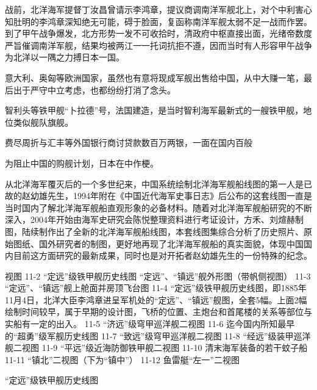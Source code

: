 \documentclass[12pt,UTF8]{ctexbook}
\begin{document}
战前，北洋海军提督丁汝昌曾请示李鸿章，提议商调南洋军舰北上，对个中利害心知肚明的李鸿章深知绝无可能，碍于脸面，复函称南洋军舰太弱不足一战而作罢。到了甲午战争爆发，北方形势一发不可收拾时，清政府中枢直接出面，光绪帝数度严旨催调南洋军舰，结果均被两江一一托词抗拒不遵，因而当时有人形容甲午战争为北洋以一隅之力搏日本一国。

意大利、奥匈等欧洲国家，虽然也有意将现成军舰出售给中国，从中大赚一笔，最后出于严守中立考虑，也都纷纷打消了念头。

智利头等铁甲舰“卜拉德”号，法国建造，是当时智利海军最新式的一艘铁甲舰，地位类似舰队旗舰。

费尽周折与汇丰等外国银行商讨贷款数百万两银，一面在国内百般

为阻止中国的购舰计划，日本在中作梗。

从北洋海军覆灭后的一个多世纪来，中国系统绘制北洋海军舰船线图的第一人是已故的赵幼雄先生，1994年附在《中国近代海军史事日志》后公布的这套线图一直是当时国内了解北洋海军舰船直观形象的必备材料。随着对北洋海军舰船研究的不断深入，2004年开始由海军史研究会陈悦整理资料进行考证设计，方禾、刘煊赫制图，陆续制作出了全新的北洋海军舰船线图，本套线图集综合分析了历史照片、原始图纸、国外研究者的制图，更好地再现了北洋海军舰船的真实面貌，体现中国国内目前这方面研究的最新成果，同时也是对开拓者赵幼雄先生的一份特殊的纪念。

视图
11-2 “定远”级铁甲舰历史线图
“定远”、“镇远”舰外形图（带帆侧视图）
11-3 “定远”、“镇远”舰上舱面并房顶飞台图
11-4 “定远”级铁甲舰历史线图，即1885年11月4日，北洋大臣李鸿章进呈军机处的“定远”、“镇远”舰图，全套5幅。上面2幅绘制时间较早，属于早期的设计图，飞桥的位置、主炮台和首尾楼的关系等部位与实船有一定的出入。
11-5 “济远”级穹甲巡洋舰二视图
11-6 迄今国内所知最早的“超勇”级军舰历史线图
11-7 “致远”级穹甲巡洋舰二视图
11-8 “经远”级装甲巡洋舰二视图
11-9 “平远”级近海防御铁甲舰二视图
11-10 清末海军装备的若干蚊子船
11-11 “镇北”二视图（下为“镇中”）
11-12 鱼雷艇“左一”二视图




“定远”级铁甲舰历史线图
\end{document}
